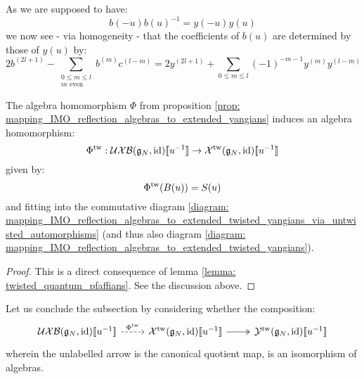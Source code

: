         As we are supposed to have:
            $$b(-u) b(u)^{-1} = y(-u) y(u)$$
        we now see - via homogeneity - that the coefficients of $b(u)$ are determined by those of $y(u)$ by:
            \begin{equation} \label{equation: b_cofficients_in_terms_of_y_coefficients}
                2b^{(2l + 1)} - \sum_{ \substack{ 0 \leq m \leq l \\ \text{$m$ even} } } b^{(m)} c^{(l - m)} = 2y^{(2l + 1)} + \sum_{0 \leq m \leq l} (-1)^{-m - 1} y^{(m)} y^{(l - m)}
            \end{equation}
            
        \begin{proposition} \label{prop: mapping_IMO_reflection_algebras_to_extended_untwisted_yangians_via_extended_twisted_yangians}
            The algebra homomorphism $\Phi$ from proposition \ref{prop: mapping_IMO_reflection_algebras_to_extended_yangians} induces an algebra homomorphism:
                $$\Phi^{\mathrm{tw}}: \mathcal{UXB}(\mathfrak{g}_N, \mathrm{id})[\![u^{-1}]\!] \to \mathcal{X}^{\mathrm{tw}}(\mathfrak{g}_N, \mathrm{id})[\![u^{-1}]\!]$$
            given by:
                $$\Phi^{\mathrm{tw}}( B(u) ) = S(u)$$
            and fitting into the commutative diagram \eqref{diagram: mapping_IMO_reflection_algebras_to_extended_twisted_yangians_via_untwisted_automorphisms} (and thus also diagram \eqref{diagram: mapping_IMO_reflection_algebras_to_extended_twisted_yangians}).
        \end{proposition}
            \begin{proof}
                This is a direct consequence of lemma \ref{lemma: twisted_quantum_pfaffians}. See the discussion above.
            \end{proof}

        Let us conclude the subsection by considering whether the composition:
            \begin{equation} \label{diagram: mapping_IMO_reflection_algebras_to_BCD0_twisted_yangians}
                \begin{tikzcd}
                    {\UXB(\g_N, \id)[\![u^{-1}]\!]} & {\calX^{\tw}(\g_N, \id)[\![u^{-1}]\!]} & {\calY^{\tw}(\g_N, \id)[\![u^{-1}]\!]}
                    \arrow["{\Phi^{\tw}}", dashed, from=1-1, to=1-2]
                    \arrow[two heads, from=1-2, to=1-3]
                \end{tikzcd}
            \end{equation}
        wherein the unlabelled arrow is the canonical quotient map, is an isomorphism of algebras. 


